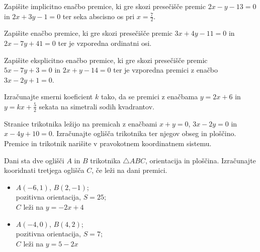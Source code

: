             \begin{naloga}
                Zapišite implicitno enačbo premice, ki gre skozi presečišče premic $2x-y-13=0$ in $2x+3y-1=0$ ter seka abscisno os pri $x=\frac{7}{2}$.
            \end{naloga}

        


        
            
            \begin{naloga}
                Zapišite enačbo premice, ki gre skozi presečišče premic $3x+4y-11=0$ in $2x-7y+41=0$ ter je vzporedna ordinatni osi.
            \end{naloga}

            \begin{naloga}
                Zapišite eksplicitno enačbo premice, ki gre skozi presečišče premic $5x-7y+3=0$ in $2x+y-14=0$ ter je vzporedna premici z enačbo $3x-2y+1=0$.
            \end{naloga}

            \begin{naloga}
                Izračunajte smerni koeficient $k$ tako, da se premici z enačbama $y=2x+6$ in $y=kx+\frac{5}{2}$ sekata na simetrali sodih kvadrantov.
            \end{naloga}

        


        
            
            \begin{naloga}
                Stranice trikotnika ležijo na premicah z enačbami $x+y=0$, $3x-2y=0$ in $x-4y+10=0$. 
                Izračunajte oglišča trikotnika ter njegov obseg in ploščino.
                Premice in trikotnik narišite v pravokotnem koordinatnem sistemu.
            \end{naloga}

            \begin{naloga}
                Dani sta dve oglišči $A$ in $B$ trikotnika $\triangle ABC$, orientacija in ploščina. Izračunajte kooridnati tretjega oglišča $C$, če leži na dani premici.
                \begin{itemize}
                    \item $A(-6,1)$, $B(2,-1)$; \\ pozitivna orientacija, $S=25$; \\ $C$ leži na $y=-2x+4$
                    \item $A(-4,0)$, $B(4,2)$; \\ pozitivna orientacija, $S=7$; \\ $C$ leži na $y=5-2x$
                \end{itemize}
            \end{naloga}


        